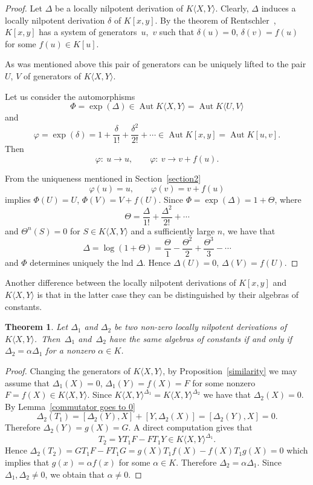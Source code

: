 \documentclass[10pt,a4paper]{amsart}
\numberwithin{equation}{section}
\newtheorem{Theorem}{Theorem}[section]
\begin{document}
\begin{proof} Let $\Delta$ be a locally nilpotent derivation of $K\langle X,Y\rangle$. Clearly, $\Delta$ induces a locally nilpotent derivation $\delta$ of $K[x,y]$.
By the theorem of Rentschler~\cite{R}, $K[x,y]$ has a system of generators~$u$,~$v$ such that $\delta(u)=0$, $\delta(v)=f(u)$ for some $f(u)\in K[u]$.

As was mentioned above this pair of generators can be uniquely lifted to the pair $U$, $V$ of generators of $K\langle X,Y\rangle$.

Let us consider the automorphisms
\[
\varPhi=\exp(\Delta)\in \operatorname{Aut}K\langle X,Y\rangle=\operatorname{Aut}K\langle U,V\rangle
\]
and
\[
\varphi=\exp(\delta) =1+\frac{\delta}{1!}+\frac{\delta^2}{2!}+\cdots\in\operatorname{Aut}K[x,y]=\operatorname{Aut}K[u,v].
\]
Then
\[
\varphi\colon \ u\to u,\qquad \varphi\colon \ v\to v+f(u).
\]

From the uniqueness mentioned in Section~\ref{section2}
\[
\varphi(u) = u,\qquad \varphi(v) = v+f(u)
\]
implies $\varPhi(U) = U$, $\varPhi(V) = V+f(U)$. Since $\varPhi=\exp(\Delta)=1+\varTheta$, where
\[
\varTheta=\frac{\Delta}{1!}+\frac{\Delta^2}{2!}+\cdots
\]
and $\varTheta^n(S)=0$ for $S\in K\langle X,Y\rangle$ and a sufficiently large $n$, we have that
\[
\Delta=\log(1+\varTheta)=\frac{\varTheta}{1}-\frac{\varTheta^2}{2}+\frac{\varTheta^3}{3}-\cdots
\]
and $\varPhi$ determines uniquely the lnd $\Delta$. Hence $\Delta(U) = 0$, $\Delta(V) = f(U)$.
\end{proof}

Another difference between the locally nilpotent derivations of $K[x,y]$ and $K\langle X,Y\rangle$ is that in the latter case they can be distinguished by their algebras of constants.

\begin{Theorem}\label{derivations with the same kernel}
Let $\Delta_1$ and $\Delta_2$ be two non-zero locally nilpotent derivations of $K\langle {X,Y}\rangle$.\
Then~$\Delta_1$ and~$\Delta_2$ have the same algebras of constants if and only if $\Delta_2=\alpha\Delta_1$ for a nonzero $\alpha\in K$.
\end{Theorem}

\begin{proof} Changing the generators of $K\langle X,Y\rangle$, by Proposition~\ref{similarity} we may assume that \mbox{$\Delta_1(X){=}0$}, $\Delta_1(Y)=f(X)=F$ for some nonzero $F=f(X)\in K\langle X,Y\rangle$. Since $K\langle X,Y\rangle^{\Delta_1}=K\langle X,Y\rangle^{\Delta_2}$ we have that $\Delta_2(X) = 0$. By Lemma~\ref{commutator goes to 0}
\[
\Delta_2(T_1) = [\Delta_2(Y),X]+[Y,\Delta_2(X)] = [\Delta_2(Y),X] = 0.
\]
Therefore $\Delta_2(Y)=g(X)= G$. A direct computation gives that
\[
T_2 = YT_1F - FT_1Y \in K\langle X,Y\rangle^{\Delta_1}.
\]
Hence $\Delta_2(T_2)=GT_1F - FT_1G = g(X)T_1f(X)-f(X)T_1g(X) = 0$ which implies that $g(x)=\alpha f(x)$ for some $\alpha\in K$. Therefore $\Delta_2=\alpha \Delta_1$. Since $\Delta_1,\Delta_2\not=0$, we obtain that $\alpha\not=0$.
\end{proof}
\end{document}
